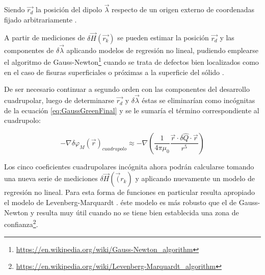 Siendo $\vec{r_{d}}$ la posición del dipolo $\vec{\lambda}$ respecto de un origen externo de coordenadas fijado arbitrariamente .

A partir de mediciones de $\delta\vec{H}(\vec{r_{k}}) $ se pueden estimar la posición $\vec{r_{d}}$ y las componentes de $\delta\vec\lambda$ aplicando modelos de regresión no lineal\citep{EstimacionNoLineal1}, pudiendo emplearse el algoritmo de Gauss-Newton\footnote{\url{https://en.wikipedia.org/wiki/Gauss-Newton\_algorithm}} cuando se trata de defectos bien localizados como en el caso de fisuras superficiales o próximas a la superficie del sólido . 


De ser necesario continuar a segundo orden con las componentes del desarrollo cuadrupolar, luego de determinarse $\vec{r_{d}}$ y $\delta\vec\lambda$ éstas se eliminarían como incógnitas de la ecuación \ref{eq:GaussGreenFinal} y se le sumaría el término correspondiente al cuadrupolo: 

\begin{equation}
	\label{eq:GaussGreenCuadrupoloFinal}
	-\nabla\delta\varphi_{M}(\vec{r})_{cuadrupolo} \approx 
	-\nabla \left( \frac{1}{4\pi\mu_{0}} 
	\frac{\vec{r} \cdot \delta\hat{Q} \cdot \vec{r}}{r^5}\right) 
\end{equation}

Los cinco coeficientes cuadrupolares incógnita ahora podrán calcularse tomando una nueva serie de mediciones $\delta\vec{H}(\vec(r_{k}) $ y aplicando nuevamente un modelo de regresión no lineal. Para esta forma de funciones en particular resulta apropiado el modelo de Levenberg-Marquardt \citep{EstimacionNoLineal2}. éste modelo es más robusto que el de Gauss-Newton y resulta muy útil cuando no se tiene bien establecida una zona de confianza\footnote{\url{https://en.wikipedia.org/wiki/Levenberg-Marquardt\_algorithm}}.



